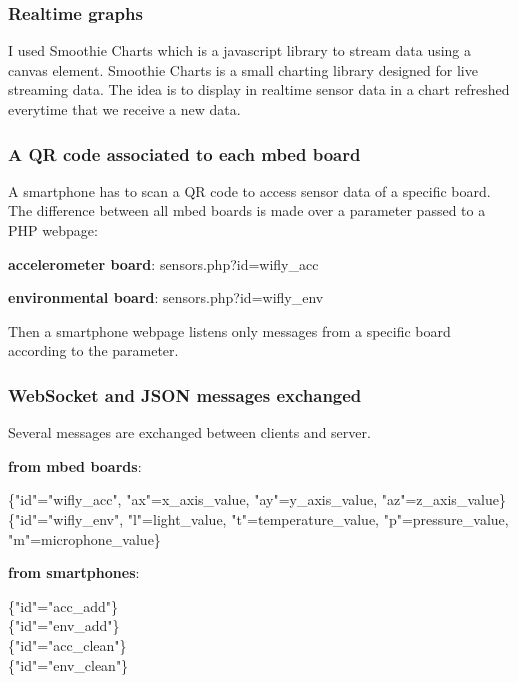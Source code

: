 \documentclass[pdftex,10pt,a4paper]{report}
\newenvironment{packed_item}{
\begin{itemize}
  \setlength{\itemsep}{1pt}
  \setlength{\parskip}{0pt}
  \setlength{\parsep}{0pt}
}{\end{itemize}}
\begin{document}
\subsubsection{Realtime graphs}
I used Smoothie Charts which is a javascript library to stream data using a canvas element. Smoothie Charts is a small charting library designed for live streaming data. The idea is to display in realtime sensor data in a chart refreshed everytime that we receive a new data.

\subsubsection{A QR code associated to each mbed board}
A smartphone has to scan a QR code to access sensor data of a specific board. The difference between all mbed boards is made over a parameter passed to a PHP webpage:
\begin{packed_item}
	\item \textbf{accelerometer board}: sensors.php?id=wifly\_acc
	\item \textbf{environmental board}: sensors.php?id=wifly\_env
\end{packed_item}

Then a smartphone webpage listens only messages from a specific board according to the parameter. 

\subsubsection{WebSocket and JSON messages exchanged}
Several messages are exchanged between clients and server. 
\begin{packed_item}
	\item \textbf{from mbed boards}: 
		\begin{center}
				\{"id"="wifly\_acc", "ax"=x\_axis\_value, "ay"=y\_axis\_value, "az"=z\_axis\_value\} \\
				\{"id"="wifly\_env", "l"=light\_value, "t"=temperature\_value, "p"=pressure\_value, "m"=microphone\_value\}
		\end{center}
	\item \textbf{from smartphones}:
		\begin{center}
				\{"id"="acc\_add"\} \\
				\{"id"="env\_add"\} \\
				\{"id"="acc\_clean"\} \\
				\{"id"="env\_clean"\}
		\end{center}
		
\end{packed_item}
\end{document}
